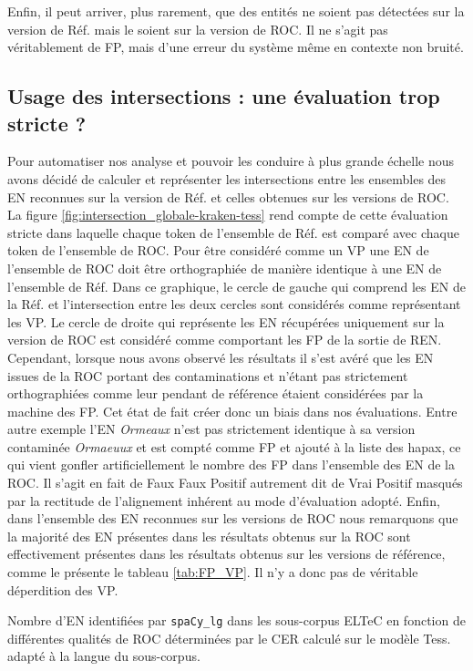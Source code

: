 Enfin, il peut arriver, plus rarement, que des entités ne soient pas détectées sur la version de Réf. mais le soient sur la version de ROC. Il ne s'agit pas véritablement de FP, mais d'une erreur du système même en contexte non bruité.


\subsection{Usage des intersections : une évaluation trop stricte ?}
\label{subsec:inter_OCR-IMPACT-NER}
Pour automatiser nos analyse et pouvoir les conduire à plus grande échelle nous avons décidé de calculer et représenter les intersections entre les ensembles des EN reconnues sur la version de Réf. et celles obtenues sur les versions de ROC. La figure \ref{fig:intersection_globale-kraken-tess} rend compte de cette évaluation stricte dans laquelle chaque token de l'ensemble de Réf. est comparé avec chaque token de l'ensemble de ROC. Pour être considéré comme un VP une EN de l'ensemble de ROC doit être orthographiée de manière identique à une EN de l'ensemble de Réf. Dans ce graphique, le cercle de gauche qui comprend les EN de la Réf. et l'intersection entre les deux cercles sont considérés comme représentant les VP. Le cercle de droite qui représente les EN récupérées uniquement sur la version de ROC est considéré comme comportant les FP de la sortie de REN. Cependant, lorsque nous avons observé les résultats il s'est avéré que les EN issues de la ROC portant des contaminations et n'étant pas strictement orthographiées comme leur pendant de référence étaient considérées par la machine des FP. Cet état de fait créer donc un biais dans nos évaluations. Entre autre exemple l'EN \textit{Ormeaux} n'est pas strictement identique à sa version contaminée \textit{Ormaeuux} et est compté comme FP et ajouté à la liste des hapax, ce qui vient gonfler artificiellement le nombre des FP dans l'ensemble des EN de la ROC. Il s'agit en fait de Faux Faux Positif autrement dit de Vrai Positif masqués par la rectitude de l'alignement inhérent au mode d'évaluation adopté. Enfin, dans l'ensemble des EN reconnues sur les versions de ROC nous remarquons que la majorité des EN présentes dans les résultats obtenus sur la ROC sont effectivement présentes dans les résultats obtenus sur les versions de référence, comme le présente le tableau \ref{tab:FP_VP}. Il n'y a donc pas de véritable déperdition des VP. 

\begin{table}[h!]
    \centering
    \small
    
    \caption{Nombre d'EN identifiées par \texttt{spaCy\_lg} dans les sous-corpus ELTeC  en fonction de différentes qualités de ROC déterminées par le CER calculé sur le modèle Tess. adapté à la langue du sous-corpus. 
    }
    \label{tab:ELTeC_bon_mauvais}
\end{table}

